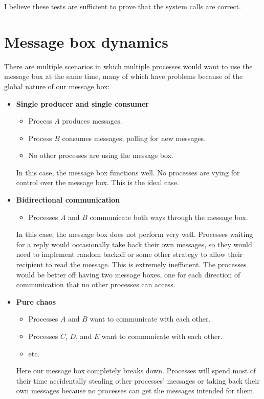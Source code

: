 \documentclass{report}
\begin{document}
\noindent I believe these tests are sufficient to prove that the system calls are correct.

\section*{Message box dynamics}

There are multiple scenarios in which multiple processes would want to use the message box at the same time, many of which have problems because of the global nature of our message box:

\begin{itemize}
	\item \textbf{Single producer and single consumer}
	      \begin{itemize}
		      \item Process $A$ produces messages.
		      \item Process $B$ consumes messages, polling for new messages.
		      \item No other processes are using the message box.
	      \end{itemize}
	      In this case, the message box functions well. No processes are vying for control over the message box. This is the ideal case.
	\item \textbf{Bidirectional communication}
	      \begin{itemize}
		      \item Processes $A$ and $B$ communicate both ways through the message box.
	      \end{itemize}
	      In this case, the message box does not perform very well. Processes waiting for a reply would occasionally take back their own messages, so they would need to implement random backoff or some other strategy to allow their recipient to read the message. This is extremely inefficient. The processes would be better off having two message boxes, one for each direction of communication that no other processes can access.
	\item \textbf{Pure chaos}
	      \begin{itemize}
		      \item Processes $A$ and $B$ want to communicate with each other.
		      \item Processes $C$, $D$, and $E$ want to communicate with each other.
		      \item etc.
	      \end{itemize}
	      Here our message box completely breaks down. Processes will spend most of their time accidentally stealing other processes' messages or taking back their own messages because no processes can get the messages intended for them.
\end{itemize}
\end{document}
